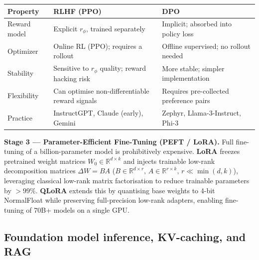 \documentclass[11pt,a4paper]{article}
\begin{document}
	\begin{keyconcept}
		\begin{center}
		\small\sffamily
		\renewcommand{\arraystretch}{1.25}
		\begin{tabular}{@{}lll@{}}
			\toprule
			\textbf{Property} & \textbf{RLHF (PPO)} & \textbf{DPO} \\
			\midrule
			Reward model & Explicit $r_\phi$, trained separately & Implicit; absorbed into policy loss \\
			Optimizer & Online RL (PPO); requires a rollout & Offline supervised; no rollout needed \\
			Stability & Sensitive to $r_\phi$ quality; reward hacking risk & More stable; simpler implementation \\
			Flexibility & Can optimise non-differentiable reward signals & Requires pre-collected preference pairs \\
			Practice & InstructGPT, Claude (early), Gemini & Zephyr, Llama-3-Instruct, Phi-3 \\
			\bottomrule
		\end{tabular}
		\end{center}
	\end{keyconcept}

	\textbf{Stage 3 --- Parameter-Efficient Fine-Tuning (PEFT / LoRA).} Full fine-tuning of a billion-parameter model is prohibitively expensive. \textbf{LoRA} \parencite{hu2021} freezes pretrained weight matrices $W_0 \in \mathbb{R}^{d \times k}$ and injects trainable low-rank decomposition matrices $\Delta W = BA$ ($B \in \mathbb{R}^{d \times r},\, A \in \mathbb{R}^{r \times k},\, r \ll \min(d,k)$), leveraging classical low-rank matrix factorisation \parencite{strang2012linear} to reduce trainable parameters by ${>}99\%$. \textbf{QLoRA} \parencite{dettmers2024} extends this by quantising base weights to 4-bit NormalFloat while preserving full-precision low-rank adapters, enabling fine-tuning of 70B+ models on a single GPU.

	\subsection{Foundation model inference, KV-caching, and RAG}
\end{document}
